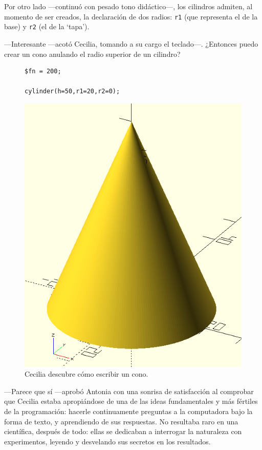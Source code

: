   \guillemotright Por otro lado ---continuó con pesado tono
  di\-dác\-ti\-co---, los cilindros admiten, al momento de ser
  creados, la declaración de dos radios: \texttt{r1} (que representa
  el de la base) y \texttt{r2} (el de la `tapa').

  ---Interesante ---acotó Cecilia, tomando a su cargo el
  te\-cla\-do---. ¿Entonces puedo crear un cono anulando el radio superior
  de un cilindro?

  \begin{figure}[ht]
  \begin{minipage}[]{.5\textwidth}
    \begin{lstlisting}
$fn = 200;

cylinder(h=50,r1=20,r2=0);
    \end{lstlisting}%
  \end{minipage}\hfill
    \begin{minipage}[]{.4\textwidth}
      \centering
      \includegraphics[width=.7\textwidth]{imagenes/cono}
    \end{minipage}
    \caption{Cecilia descubre cómo escribir un cono.}
  \label{fig:cono}
\end{figure}


---Parece que sí ---aprobó Antonia con una sonrisa de satisfacción al
comprobar que Cecilia estaba apropiándose de una de las ideas
fundamentales y más fértiles de la programación: hacerle continuamente
preguntas a la computadora bajo la forma de texto, y aprendiendo de
sus respuestas. No resultaba raro en una científica, después de todo:
ellas se dedicaban a interrogar la naturaleza con experimentos,
leyendo y desvelando sus secretos en los resultados.



